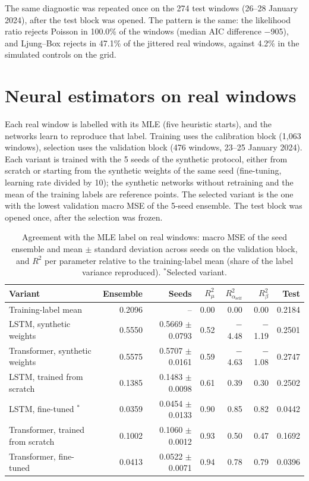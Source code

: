 The same diagnostic was repeated once on the 274 test windows (26--28 January
2024), after the test block was opened. The pattern is the same: the likelihood ratio rejects
Poisson in 100.0\% of the windows (median
AIC difference $-$905), and Ljung--Box rejects in
47.1\% of the jittered real windows,
against 4.2\% in the
simulated controls on the grid.

\section{Neural estimators on real windows}
\label{sec:real-networks}

Each real window is labelled with its MLE (five heuristic starts), and the networks learn to
reproduce that label. Training uses the calibration block (1,063
windows), selection uses the validation block (476 windows, 23--25
January 2024). Each variant is trained with the 5 seeds of the synthetic
protocol, either from scratch or starting from the synthetic weights of the same seed
(fine-tuning, learning rate divided by 10); the synthetic networks without retraining and the
mean of the training labels are reference points. The selected variant is the one with the
lowest validation macro MSE of the 5-seed ensemble. The test block was opened once, after the selection was frozen.

\begin{table}[htbp]
\centering
\caption{Agreement with the MLE label on real windows: macro MSE of the seed ensemble and
mean $\pm$ standard deviation across seeds on the validation block, and $R^2$ per parameter
relative to the training-label mean (share of the label variance reproduced).
$^{\ast}$Selected variant.}
\label{tab:real-networks}
\small
\begin{tabular}{lrrrrrr}
\toprule
Variant & Ensemble & Seeds & $R^2_{\mu}$ & $R^2_{\alpha_{\mathrm{self}}}$ & $R^2_{\beta}$ & Test\\
\midrule
Training-label mean & 0.2096 & -- & 0.00 & 0.00 & 0.00 & 0.2184\\
LSTM, synthetic weights & 0.5550 & 0.5669 $\pm$ 0.0793 & 0.52 & $-$4.48 & $-$1.19 & 0.2501\\
Transformer, synthetic weights & 0.5575 & 0.5707 $\pm$ 0.0161 & 0.59 & $-$4.63 & $-$1.08 & 0.2747\\
LSTM, trained from scratch & 0.1385 & 0.1483 $\pm$ 0.0098 & 0.61 & 0.39 & 0.30 & 0.2502\\
LSTM, fine-tuned $^{\ast}$ & 0.0359 & 0.0454 $\pm$ 0.0133 & 0.90 & 0.85 & 0.82 & 0.0442\\
Transformer, trained from scratch & 0.1002 & 0.1060 $\pm$ 0.0012 & 0.93 & 0.50 & 0.47 & 0.1692\\
Transformer, fine-tuned & 0.0413 & 0.0522 $\pm$ 0.0071 & 0.94 & 0.78 & 0.79 & 0.0396\\
\bottomrule
\end{tabular}
\end{table}

